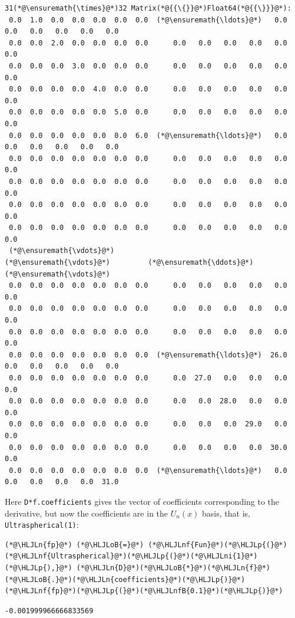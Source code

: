 \documentclass[12pt,a4paper]{article}
\newcommand{\HLJLn}[1]{#1}
\newcommand{\HLJLnf}[1]{\textcolor[RGB]{66,102,213}{#1}}
\newcommand{\HLJLnfB}[1]{\textcolor[RGB]{59,151,46}{#1}}
\newcommand{\HLJLni}[1]{\textcolor[RGB]{59,151,46}{#1}}
\newcommand{\HLJLoB}[1]{\textcolor[RGB]{102,102,102}{\textbf{#1}}}
\newcommand{\HLJLp}[1]{#1}
\begin{document}
\begin{lstlisting}
31(*@\ensuremath{\times}@*)32 Matrix(*@{{\{}}@*)Float64(*@{{\}}}@*):
 0.0  1.0  0.0  0.0  0.0  0.0  0.0  (*@\ensuremath{\ldots}@*)   0.0   0.0   0.0   0.0   0.0   0.0
 0.0  0.0  2.0  0.0  0.0  0.0  0.0      0.0   0.0   0.0   0.0   0.0   0.0
 0.0  0.0  0.0  3.0  0.0  0.0  0.0      0.0   0.0   0.0   0.0   0.0   0.0
 0.0  0.0  0.0  0.0  4.0  0.0  0.0      0.0   0.0   0.0   0.0   0.0   0.0
 0.0  0.0  0.0  0.0  0.0  5.0  0.0      0.0   0.0   0.0   0.0   0.0   0.0
 0.0  0.0  0.0  0.0  0.0  0.0  6.0  (*@\ensuremath{\ldots}@*)   0.0   0.0   0.0   0.0   0.0   0.0
 0.0  0.0  0.0  0.0  0.0  0.0  0.0      0.0   0.0   0.0   0.0   0.0   0.0
 0.0  0.0  0.0  0.0  0.0  0.0  0.0      0.0   0.0   0.0   0.0   0.0   0.0
 0.0  0.0  0.0  0.0  0.0  0.0  0.0      0.0   0.0   0.0   0.0   0.0   0.0
 0.0  0.0  0.0  0.0  0.0  0.0  0.0      0.0   0.0   0.0   0.0   0.0   0.0
 (*@\ensuremath{\vdots}@*)                        (*@\ensuremath{\vdots}@*)         (*@\ensuremath{\ddots}@*)                           (*@\ensuremath{\vdots}@*)    
 0.0  0.0  0.0  0.0  0.0  0.0  0.0      0.0   0.0   0.0   0.0   0.0   0.0
 0.0  0.0  0.0  0.0  0.0  0.0  0.0      0.0   0.0   0.0   0.0   0.0   0.0
 0.0  0.0  0.0  0.0  0.0  0.0  0.0      0.0   0.0   0.0   0.0   0.0   0.0
 0.0  0.0  0.0  0.0  0.0  0.0  0.0  (*@\ensuremath{\ldots}@*)  26.0   0.0   0.0   0.0   0.0   0.0
 0.0  0.0  0.0  0.0  0.0  0.0  0.0      0.0  27.0   0.0   0.0   0.0   0.0
 0.0  0.0  0.0  0.0  0.0  0.0  0.0      0.0   0.0  28.0   0.0   0.0   0.0
 0.0  0.0  0.0  0.0  0.0  0.0  0.0      0.0   0.0   0.0  29.0   0.0   0.0
 0.0  0.0  0.0  0.0  0.0  0.0  0.0      0.0   0.0   0.0   0.0  30.0   0.0
 0.0  0.0  0.0  0.0  0.0  0.0  0.0  (*@\ensuremath{\ldots}@*)   0.0   0.0   0.0   0.0   0.0  31.0
\end{lstlisting}


Here \texttt{D*f.coefficients} gives the vector of coefficients corresponding to the derivative, but now the coefficients are in the $U_n(x)$ basis, that is, \texttt{Ultraspherical(1)}:


\begin{lstlisting}
(*@\HLJLn{fp}@*) (*@\HLJLoB{=}@*) (*@\HLJLnf{Fun}@*)(*@\HLJLp{(}@*)(*@\HLJLnf{Ultraspherical}@*)(*@\HLJLp{(}@*)(*@\HLJLni{1}@*)(*@\HLJLp{),}@*) (*@\HLJLn{D}@*)(*@\HLJLoB{*}@*)(*@\HLJLn{f}@*)(*@\HLJLoB{.}@*)(*@\HLJLn{coefficients}@*)(*@\HLJLp{)}@*)
(*@\HLJLnf{fp}@*)(*@\HLJLp{(}@*)(*@\HLJLnfB{0.1}@*)(*@\HLJLp{)}@*)
\end{lstlisting}

\begin{lstlisting}
-0.001999966666833569
\end{lstlisting}
\end{document}
